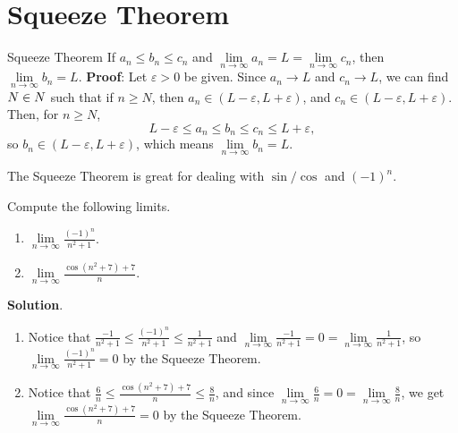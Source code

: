 \section{Squeeze Theorem}
\begin{Theorem}{Squeeze Theorem}{}
    If $ a_n\le b_n\le c_n $ and $ \lim\limits_{{n} \to {\infty}}a_n=L=\lim\limits_{{n} \to {\infty}}c_n $,
    then $ \lim\limits_{{n} \to {\infty}}b_n=L $.
    \tcblower{}
    \textbf{Proof}: Let $ \varepsilon>0 $ be given.
    Since $ a_n\to L $ and $ c_n\to L $, we can find $ N\in\relax{N} $
    such that if $ n\ge N $, then $ a_n\in(L-\varepsilon,L+\varepsilon) $,
    and $ c_n\in(L-\varepsilon,L+\varepsilon) $. Then, for $ n\ge N $,
    \[ L-\varepsilon\le a_n\le b_n\le c_n\le L+\varepsilon, \]
    so $ b_n\in (L-\varepsilon,L+\varepsilon) $, which means
    $ \lim\limits_{{n} \to {\infty}}b_n=L $.
\end{Theorem}
\begin{Remark}{}{}
    The Squeeze Theorem is great for dealing with $ \sin/\cos $
    and $ (-1)^n $.
\end{Remark}
\begin{Example}{}{}
    Compute the following limits.
    \begin{enumerate}[(1)]
        \item $ \lim\limits_{{n} \to {\infty}}\frac{(-1)^n}{n^2+1} $.
        \item $ \lim\limits_{{n} \to {\infty}}\frac{\cos(n^2+7)+7}{n} $.
    \end{enumerate}
    \tcblower{}
    \textbf{Solution}.
    \begin{enumerate}[(1)]
        \item Notice that $ \frac{-1}{n^2+1}\le \frac{(-1)^n}{n^2+1}\le \frac{1}{n^2+1} $
              and $ \lim\limits_{{n} \to {\infty}}\frac{-1}{n^2+1}=0=\lim\limits_{{n} \to {\infty}}\frac{1}{n^2+1} $,
              so $ \lim\limits_{{n} \to {\infty}}\frac{(-1)^n}{n^2+1}=0 $ by the Squeeze Theorem.
        \item Notice that $ \frac{6}{n}\le \frac{\cos(n^2+7)+7}{n}\le \frac{8}{n} $,
              and since $ \lim\limits_{{n} \to {\infty}}\frac{6}{n}=0=\lim\limits_{{n} \to {\infty}}\frac{8}{n} $,
              we get $ \lim\limits_{{n} \to {\infty}}\frac{\cos(n^2+7)+7}{n}=0 $ by the Squeeze Theorem.
    \end{enumerate}
\end{Example}
